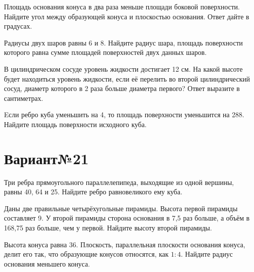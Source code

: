 \documentclass[4apaper]{article}
\begin{document}
\begin{taskBN}{3}
Площадь основания конуса в два раза меньше площади боковой поверхности. Найдите угол между образующей конуса и плоскостью основания. Ответ дайте в градусах.
\end{taskBN}

\begin{taskBN}{4}
Радиусы двух шаров равны $6$ и $8$. Найдите радиус шара, площадь поверхности которого равна сумме площадей поверхностей двух данных шаров.
\end{taskBN}

\begin{taskBN}{5}
В цилиндрическом сосуде уровень жидкости достигает 12 см. На какой высоте будет находиться уровень жидкости, если её перелить во второй цилиндрический сосуд, диаметр которого в 2 раза больше диаметра первого? Ответ выразите в сантиметрах.
\end{taskBN}

\begin{taskBN}{6}
Eсли ребро куба уменьшить на 4, то площадь поверхности уменьшится на 288. Найдите площадь поверхности исходного куба.
\end{taskBN}
\newpage\section*{Вариант№21}

\begin{taskBN}{1}
Три ребра прямоугольного параллелепипеда, выходящие из одной вершины, равны 40, 64 и 25. Найдите ребро равновеликого ему куба.
\end{taskBN}

\begin{taskBN}{2}
Даны две правильные четырёхугольные пирамиды. Высота первой пирамиды составляет 9. У второй пирамиды сторона основания в 7,5 раз больше, а объём в 168,75 раз больше, чем у первой. Найдите высоту второй пирамиды.
\end{taskBN}

\begin{taskBN}{3}
Высота конуса равна $36$. Плоскость, параллельная плоскости основания конуса,  делит его так, что образующие конусов относятся, как $1:4$. Найдите радиус основания меньшего конуса. 
\end{taskBN}
\end{document}
